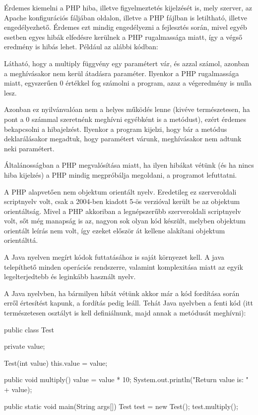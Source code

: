 Érdemes kiemelni a PHP hiba, illetve figyelmeztetés kijelzését is, mely szerver, az Apache konfigurációs fáljában oldalon, illetve a PHP fájlban is letiltható, illetve engedélyezhető. Érdemes ezt mindig engedélyezni a fejlesztés során, mivel egyéb esetben egyes hibák elfedésre kerülnek a PHP rugalmassága miatt, így a végső eredmény is hibás lehet. Például az alábbi kódban:


Látható, hogy a multiply függvény egy paramétert vár, és azzal számol, azonban a meghívásakor nem kerül átadásra paraméter. Ilyenkor a PHP rugalmassága miatt, egyszerűen 0 értékkel fog számolni a program, azaz a végeredmény is nulla lesz.

Azonban ez nyilvánvalóan nem a helyes működés lenne (kivéve természetesen, ha pont a 0 számmal szeretnénk meghívni egyébként is a metódust), ezért érdemes bekapcsolni a hibajelzést. Ilyenkor a program kijelzi, hogy bár a metódus deklarálásakor megadtuk, hogy paramétert várunk, meghívásakor nem adtunk neki paramétert.

Általánosságban a PHP megvalósítása miatt, ha ilyen hibákat vétünk (és ha nincs hiba kijelzés) a PHP mindig megpróbálja megoldani, a programot lefuttatni.

A PHP alapvetően nem objektum orientált nyelv. Eredetileg ez szerveroldali scriptnyelv volt, csak a 2004-ben kiadott 5-ös verzióval került be az objektum orientáltság. Mivel a PHP akkoriban a legnépszerűbb szerveroldali scriptnyelv volt, sőt még manapság is az, nagyon sok olyan kód készült, melyben objektum orientált leírás nem volt, így ezeket először át kellene alakítani objektum orientálttá.

A Java nyelven megírt kódok futtatásához is saját környezet kell. A java telepíthető minden operációs rendszerre, valamint komplexitása miatt az egyik legelterjedtebb és leginkább használt nyelv.

A Java nyelvben, ha bármilyen hibát vétünk akkor már a kód fordítása során erről értesítést kapunk, a fordítás pedig leáll. Tehát Java nyelvben a fenti kód (itt természetesen osztályt is kell definiálnunk, majd annak a metódusát meghívni):

\begin{cpp}
public class Test {
    private value;
    
    Test(int value) {
        this.value = value;
    }

   public void multiply() {
      value = value * 10;
      System.out.println("Return value is: " + value);
   }

   public static void main(String args[]) {
      Test test = new Test();
      test.multiply();
   }
}
\end{cpp}

